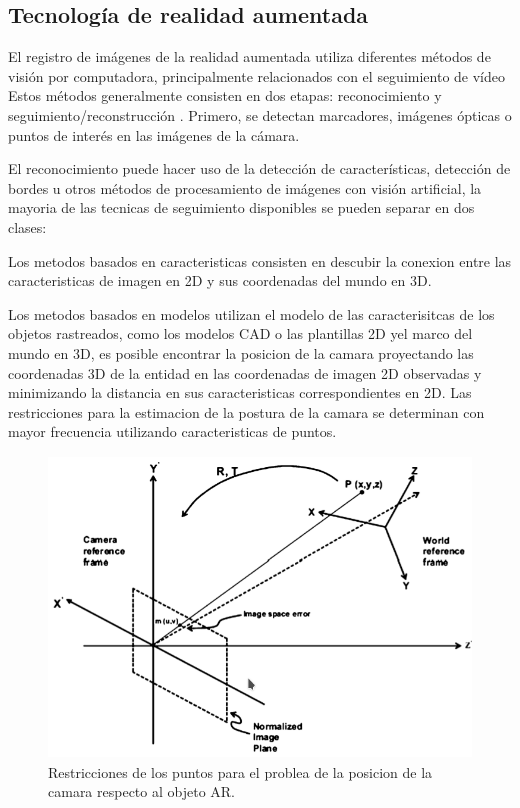 \subsection{Tecnología de realidad aumentada}
El registro de imágenes de la realidad aumentada utiliza diferentes métodos de visión por computadora, principalmente relacionados con el seguimiento de vídeo Estos métodos generalmente consisten en dos etapas: reconocimiento y seguimiento/reconstrucción . Primero, se detectan marcadores, imágenes ópticas o puntos de interés en las imágenes de la cámara.\cite{BXX} \par
\vspace{5mm}
El reconocimiento puede hacer uso de la detección de características, detección de bordes u otros métodos de procesamiento de imágenes con visión artificial, la mayoria de las tecnicas de seguimiento disponibles se pueden separar en dos clases:\cite{BXX} \par
\vspace{5mm}
Los metodos basados en caracteristicas consisten en descubir la conexion entre las caracteristicas de imagen en 2D y sus coordenadas del mundo en 3D. \cite{BXX} \par
\vspace{5mm}
Los metodos basados en modelos utilizan el modelo de las caracterisitcas de los objetos rastreados, como los modelos CAD o las plantillas 2D yel marco del mundo en 3D, es posible encontrar la posicion de la camara proyectando las coordenadas 3D de la entidad en las coordenadas de imagen 2D observadas y minimizando la distancia en sus caracteristicas correspondientes en 2D. Las restricciones para la estimacion de la postura de la camara se determinan con mayor frecuencia utilizando caracteristicas de puntos.\cite{BXX}\par
\begin{figure}[h!]
	\centering
	\includegraphics[width=12cm,height=8cm]{imagenes/marcoteorico/ar/tecnologyAR.png}
	\caption{Restricciones de los puntos para el problea de la posicion de la camara respecto al objeto AR.\cite{BXX}}
	\label{fig:analogo}
\end{figure}
